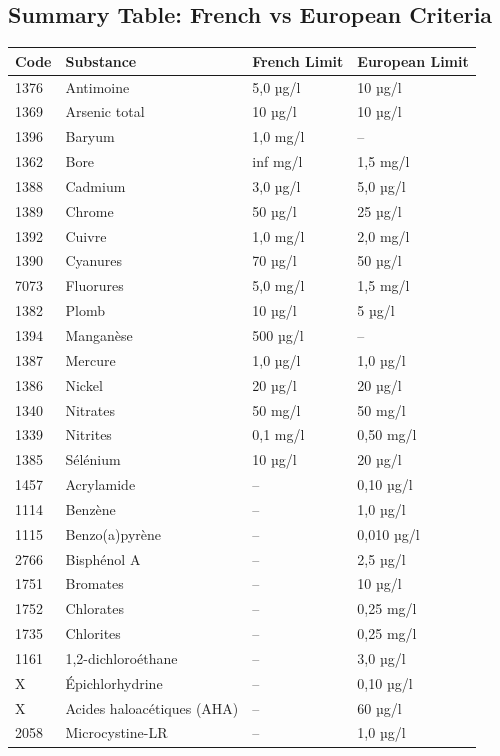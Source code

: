 \documentclass{article}
\begin{document}
\subsection{Summary Table: French vs European Criteria}
\begin{table}[H]
\centering
\begin{tabular}{|l|l|l|l|}
\hline
\textbf{Code} & \textbf{Substance} & \textbf{French Limit} & \textbf{European Limit} \\
\hline
1376 & Antimoine & 5,0 µg/l & 10 µg/l \\
1369 & Arsenic total & 10 µg/l & 10 µg/l \\
1396 & Baryum & 1,0 mg/l & -- \\
1362 & Bore & inf mg/l & 1,5 mg/l \\
1388 & Cadmium & 3,0 µg/l & 5,0 µg/l \\
1389 & Chrome & 50 µg/l & 25 µg/l \\
1392 & Cuivre & 1,0 mg/l & 2,0 mg/l \\
1390 & Cyanures & 70 µg/l & 50 µg/l \\
7073 & Fluorures & 5,0 mg/l & 1,5 mg/l \\
1382 & Plomb & 10 µg/l & 5 µg/l \\
1394 & Manganèse & 500 µg/l & -- \\
1387 & Mercure & 1,0 µg/l & 1,0 µg/l \\
1386 & Nickel & 20 µg/l & 20 µg/l \\
1340 & Nitrates & 50 mg/l & 50 mg/l \\
1339 & Nitrites & 0,1 mg/l & 0,50 mg/l \\
1385 & Sélénium & 10 µg/l & 20 µg/l \\
1457 & Acrylamide & -- & 0,10 µg/l \\
1114 & Benzène & -- & 1,0 µg/l \\
1115 & Benzo(a)pyrène & -- & 0,010 µg/l \\
2766 & Bisphénol A & -- & 2,5 µg/l \\
1751 & Bromates & -- & 10 µg/l \\
1752 & Chlorates & -- & 0,25 mg/l \\
1735 & Chlorites & -- & 0,25 mg/l \\
1161 & 1,2-dichloroéthane & -- & 3,0 µg/l \\
X & Épichlorhydrine & -- & 0,10 µg/l \\
X & Acides haloacétiques (AHA) & -- & 60 µg/l \\
2058 & Microcystine-LR & -- & 1,0 µg/l \\

\end{tabular}
\end{table}
\end{document}
